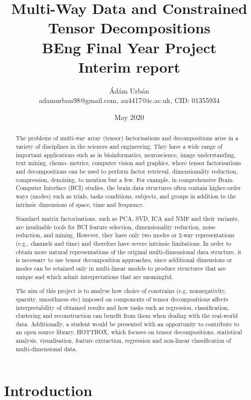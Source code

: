 \documentclass{article}
\title{ \textbf{Multi-Way Data and Constrained Tensor Decompositions} \\ BEng Final Year Project \\ Interim report}
\author{Ádám Urbán\\adamurban98@gmail.com, au4417@ic.ac.uk, CID: 01355934}
\date{May 2020}
\begin{document}
\maketitle

\begin{abstract}
The problems of multi-way array (tensor) factorisations and decompositions arise in a variety of disciplines in the sciences and engineering. They have a wide range of important applications such as in bioinformatics, neuroscience, image understanding, text mining, chemo- metrics, computer vision and graphics, where tensor factorisations and decompositions can be used to perform factor retrieval, dimensionality reduction, compression, denoising, to mention but a few. For example, in comprehensive Brain Computer Interface (BCI) studies, the brain data structures often contain higher-order ways (modes) such as trials, tasks conditions, subjects, and groups in addition to the intrinsic dimensions of space, time and frequency.

Standard matrix factorisations, such as PCA, SVD, ICA and NMF and their variants, are invaluable tools for BCI feature selection, dimensionality reduction, noise reduction, and mining. However, they have only two modes or 2-way representations (e.g., channels and time) and therefore have severe intrinsic limitations. In order to obtain more natural representations of the original multi-dimensional data structure, it is necessary to use tensor decomposition approaches, since additional dimensions or modes can be retained only in multi-linear models to produce structures that are unique and which admit interpretations that are meaningful.

The aim of this project is to analyse how choice of constrains (e.g. nonnegativity, sparsity, smoothness etc) imposed on components of tensor decompositions affects interpretability of obtained results and how tasks such as regression, classification, clustering and reconstruction can benefit from them when dealing with the real-world data. Additionally, a student would be presented with an opportunity to contribute to an open source library, HOTTBOX, which focuses on tensor decompositions, statistical analysis, visualisation, feature extraction, regression and non-linear classification of multi-dimensional data.
\end{abstract}

\section{Introduction}
\end{document}
